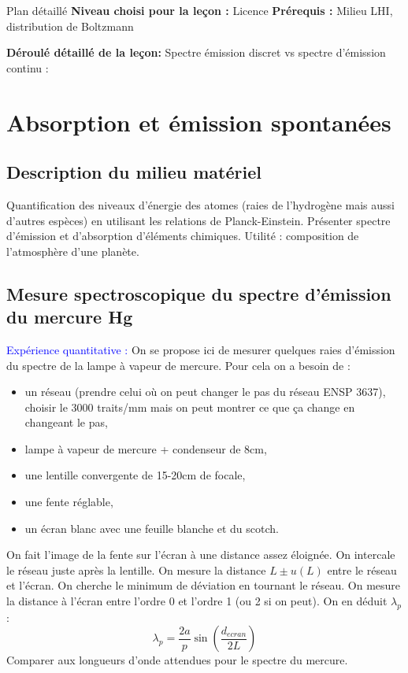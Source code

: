 \begin{reportBlock}{Plan détaillé}
  \textbf{Niveau choisi pour la leçon :} Licence
  \newline
  \textbf{Prérequis : }Milieu LHI, distribution de Boltzmann
  \newline
  
  \textbf{Déroulé détaillé de la leçon: }   \newline
Spectre émission discret vs spectre d'émission continu : 
  \section{Absorption et émission spontanées}

  \subsection{Description du milieu matériel}
  Quantification des niveaux d'énergie des atomes (raies de l'hydrogène mais aussi d'autres espèces) en utilisant les relations de Planck-Einstein. Présenter spectre d'émission et d'absorption d'éléments chimiques. Utilité : composition de l'atmosphère d'une planète.
  \subsection{Mesure spectroscopique du spectre d'émission du mercure Hg}
  \textcolor{blue}{Expérience quantitative :} On se propose ici de mesurer quelques raies d'émission du spectre de la lampe à vapeur de mercure. Pour cela on a besoin de :
  \begin{itemize}
      \item un réseau (prendre celui où on peut changer le pas du réseau ENSP 3637), choisir le 3000 traits/mm mais on peut montrer ce que ça change en changeant le pas,
      \item lampe à vapeur de mercure + condenseur de 8cm,
      \item une lentille convergente de 15-20cm de focale,
      \item une fente réglable,
      \item un écran blanc avec une feuille blanche et du scotch.
  \end{itemize}
On fait l'image de la fente sur l'écran à une distance assez éloignée. On intercale le réseau juste après la lentille. On mesure la distance $L\pm u(L)$ entre le réseau et l'écran. On cherche le minimum de déviation en tournant le réseau. On mesure la distance à l'écran entre l'ordre 0 et l'ordre 1 (ou 2 si on peut). On en déduit $\lambda_p$ :
\begin{equation}
    \lambda_p = \frac{2a}{p}\sin\left(\frac{d_{ecran}}{2L}\right)
\end{equation}
Comparer aux longueurs d'onde attendues pour le spectre du mercure.

\end{reportBlock}
